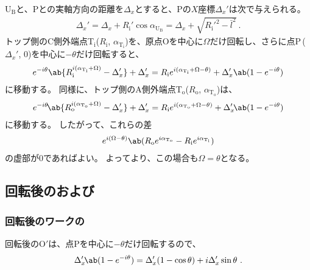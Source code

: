 \ReceiverPlateCenter U$_\mathrm B$と、\TableCenter Pとの実軸方向の距離を$\Delta_x$とすると、\TableCenter Pの$X$座標$\Delta_x'$は次で与えられる。
\begin{align}
  \label{eq:tableCenter}
  \Delta_x'
  = \Delta_x+R_\mathrm i'\cos\alpha_{\mathrm U_\mathrm B} = \Delta_x+\sqrt{R_\mathrm i'^2-\bar l^2}\ .
\end{align}
トップ側のC側外端点T$_\mathrm i$($R_\mathrm i$, $\alpha_{\mathrm T_\mathrm i}$)を、原点Oを中心に$\Omega$だけ回転し、さらに点P\,($\Delta_x'$, $0$)を中心に$-\theta$だけ回転すると、
\begin{align}
  \label{eq:afterfttable}
  e^{-i\theta}\ab\{R_\mathrm i^{i(\alpha_{\mathrm T_\mathrm i}+\Omega)}-\Delta_x'\}+\Delta_x'
  = R_\mathrm ie^{i(\alpha_{\mathrm T_\mathrm i}+\Omega-\theta)}+\Delta_x'\ab(1-e^{-i\theta})
\end{align}
に移動する。
同様に、トップ側のA側外端点T$_\mathrm o$($R_\mathrm o$, $\alpha_{\mathrm T_\mathrm o}$)は、
\begin{align*}
  e^{-i\theta}\!\ab\{R_\mathrm o^{i(\alpha_{\mathrm T_\mathrm o}+\Omega)}-\Delta_x'\}+\Delta_x'
  = R_\mathrm ie^{i(\alpha_{\mathrm T_\mathrm o}+\Omega-\theta)}+\Delta_x'\!\ab(1-e^{-i\theta})
\end{align*}
に移動する。
したがって、これらの差
\begin{align*}
  e^{i(\Omega-\theta)}
  \ab(R_\mathrm oe^{i\alpha_{\mathrm T_\mathrm o}}-R_\mathrm ie^{i\alpha_{\mathrm T_\mathrm i}})
\end{align*}
の虚部が$0$であればよい。
よってより、この場合も$\Omega = \theta$となる。


\subsection{回転後の\CurvatureCenter および\ReceiverPlateContactPoint}

\subsubsection{回転後のワークの\CurvatureCenter}
回転後の\nameCurvatureCenter O$'$は、点Pを中心に$-\theta$だけ回転するので、
\begin{align*}
  \Delta_x'\!\ab(1-e^{-i\theta}) = \Delta_x'(1-\cos\theta)+i\Delta_x'\sin\theta\ .
\end{align*}

